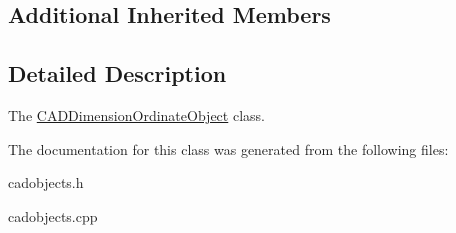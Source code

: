 \subsection*{Additional Inherited Members}


\subsection{Detailed Description}
The \hyperlink{class_c_a_d_dimension_ordinate_object}{C\+A\+D\+Dimension\+Ordinate\+Object} class. 

The documentation for this class was generated from the following files\+:\begin{DoxyCompactItemize}
\item 
cadobjects.\+h\item 
cadobjects.\+cpp\end{DoxyCompactItemize}
